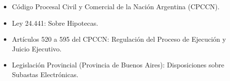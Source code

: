 \documentclass[12pt,oneside]{book}
\begin{document}
\begin{itemize}
    \item Código Procesal Civil y Comercial de la Nación Argentina (CPCCN).
    \item Ley 24.441: Sobre Hipotecas.
    \item Artículos 520 a 595 del CPCCN: Regulación del Proceso de Ejecución y Juicio Ejecutivo.
    \item Legislación Provincial (Provincia de Buenos Aires): Disposiciones sobre Subastas Electrónicas.
\end{itemize}

\end{document}
